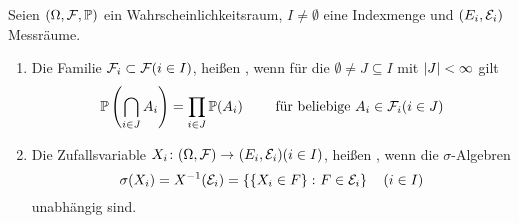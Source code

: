\begin{definition} \label{def: 3_2_15}
	Seien $(\Omega, \mathcal{F},\mathbb{P})$ ein Wahrscheinlichkeitsraum, $I \neq \emptyset$ eine Indexmenge und $(E_i, \mathcal{E}_i)$ Messräume.
	\begin{enumerate}[leftmargin=*]
		\item Die Familie $\mathcal{F}_i \subset \mathcal{F} (i \in I)$, heißen , wenn für die $\emptyset \neq J \subseteq I$ mit $\left| J \right| < \infty$ gilt
		\begin{equation*}
			\mathbb{P}\left( \bigcap_{i \in J} A_i \right) = \prod_{i \in J} \mathbb{P}(A_i) \qquad \text{ für beliebige } A_i \in \mathcal{F}_i (i \in J)
		\end{equation*}
		\item Die Zufallsvariable $\abb{X_i}{(\Omega, \F)}{(E_i, \E_i)} (i \in I)$, heißen , wenn die $\sigma$-Algebren
		\begin{equation*}
			\sigma(X_i) = X^{-1}(\mathcal{E}_i) = \left\{ \left\{ X_i \in F \right\} \colon F \in \mathcal{E}_i \right\} \quad (i \in I)
		\end{equation*}
		unabhängig sind.
	\end{enumerate}
\end{definition}
%
